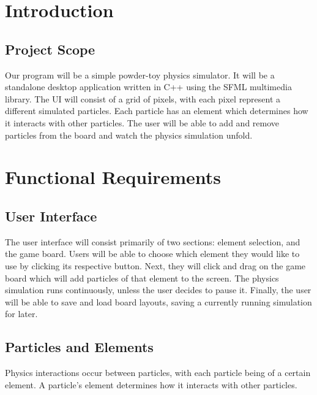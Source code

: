 \documentclass[12pt]{article}
\begin{document}
    \pagestyle{fancy}


    \section{Introduction}

    \subsection{Project Scope}

    Our program will be a simple powder-toy physics simulator. It will be a
    standalone desktop application written in C++ using the SFML multimedia
    library. The UI will consist
    of a grid of pixels, with each pixel represent a different simulated
    particles. Each particle has an element which determines how it interacts
    with other particles. The user will be able to add and remove particles from
    the board and watch the physics simulation unfold.

    \section{Functional Requirements}

    \subsection{User Interface}

    The user interface will consist primarily of two sections: element
    selection, and the game board.
    Users will be able to choose which element they would like to use by
    clicking its respective button.
    Next, they will click and drag on the game board which will add particles of
    that element to the screen.
    The physics simulation runs continuously, unless the user decides to pause
    it.
    Finally, the user will be able to save and load board layouts, saving a
    currently running simulation for later.

    \subsection{Particles and Elements}
    
    Physics interactions occur between particles, with each particle being of a
    certain element.
    A particle's element determines how it interacts with other particles.
    
\end{document}
